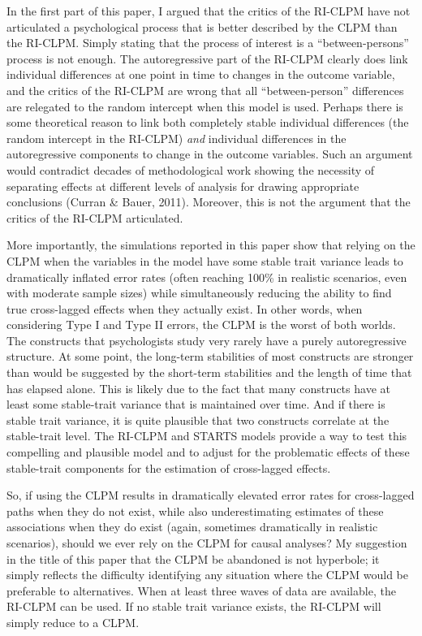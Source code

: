 \documentclass[
  english,
  man,floatsintext]{apa6}
\begin{document}
In the first part of this paper, I argued that the critics of the RI-CLPM have not articulated a psychological process that is better described by the CLPM than the RI-CLPM. Simply stating that the process of interest is a ``between-persons'' process is not enough. The autoregressive part of the RI-CLPM clearly does link individual differences at one point in time to changes in the outcome variable, and the critics of the RI-CLPM are wrong that all ``between-person'' differences are relegated to the random intercept when this model is used. Perhaps there is some theoretical reason to link both completely stable individual differences (the random intercept in the RI-CLPM) \emph{and} individual differences in the autoregressive components to change in the outcome variables. Such an argument would contradict decades of methodological work showing the necessity of separating effects at different levels of analysis for drawing appropriate conclusions (Curran \& Bauer, 2011). Moreover, this is not the argument that the critics of the RI-CLPM articulated.

More importantly, the simulations reported in this paper show that relying on the CLPM when the variables in the model have some stable trait variance leads to dramatically inflated error rates (often reaching 100\% in realistic scenarios, even with moderate sample sizes) while simultaneously reducing the ability to find true cross-lagged effects when they actually exist. In other words, when considering Type I and Type II errors, the CLPM is the worst of both worlds. The constructs that psychologists study very rarely have a purely autoregressive structure. At some point, the long-term stabilities of most constructs are stronger than would be suggested by the short-term stabilities and the length of time that has elapsed alone. This is likely due to the fact that many constructs have at least some stable-trait variance that is maintained over time. And if there is stable trait variance, it is quite plausible that two constructs correlate at the stable-trait level. The RI-CLPM and STARTS models provide a way to test this compelling and plausible model and to adjust for the problematic effects of these stable-trait components for the estimation of cross-lagged effects.

So, if using the CLPM results in dramatically elevated error rates for cross-lagged paths when they do not exist, while also underestimating estimates of these associations when they do exist (again, sometimes dramatically in realistic scenarios), should we ever rely on the CLPM for causal analyses? My suggestion in the title of this paper that the CLPM be abandoned is not hyperbole; it simply reflects the difficulty identifying any situation where the CLPM would be preferable to alternatives. When at least three waves of data are available, the RI-CLPM can be used. If no stable trait variance exists, the RI-CLPM will simply reduce to a CLPM.
\end{document}
